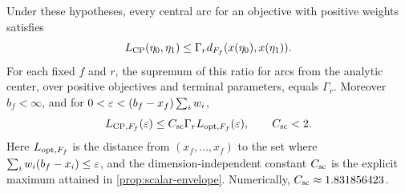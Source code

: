 \begin{theorem}
\label{thm:normalized-scalar}
Under these hypotheses, every central arc for an objective with
positive weights satisfies
\[
 L_{\mathrm{CP}}(\eta_0,\eta_1)\leq
 \Gamma_r d_{F_f}(x(\eta_0),x(\eta_1)).
\]
For each fixed $f$ and $r$, the supremum of this ratio for arcs from
the analytic center, over positive objectives and terminal
parameters, equals $\Gamma_r$. Moreover $b_f<\infty$, and for
$0<\varepsilon<(b_f-x_f)\sum_iw_i$,
\begin{equation}
 L_{\mathrm{CP},F_f}(\varepsilon)\leq C_{\mathrm{sc}}\Gamma_r L_{\mathrm{opt},F_f}(\varepsilon),
 \qquad C_{\mathrm{sc}}<2.
 \label{eq:general-accuracy}
\end{equation}
Here $L_{\mathrm{opt},F_f}$ is the distance from $(x_f,\ldots,x_f)$ to the
set where $\sum_iw_i(b_f-x_i)\leq\varepsilon$, and the dimension-independent
constant $C_{\mathrm{sc}}$ is the explicit maximum attained in
\cref{prop:scalar-envelope}. Numerically, $C_{\mathrm{sc}}\approx1.831856423$.
\end{theorem}

